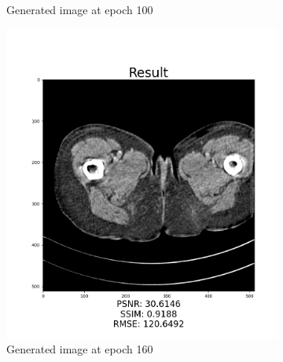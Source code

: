 \documentclass[journal]{IEEEtran}
\begin{document}
\begin{figure}
\begin{subfigure}[t]{0.22\textwidth}
         \caption{Generated image at epoch 100}
         \label{epoch100}
     \end{subfigure}
     \begin{subfigure}[t]{0.22\textwidth}
         \centering
         \includegraphics[width=\textwidth]{epoch160}
         \caption{Generated image at epoch 160}
         \label{epoch160}
     \end{subfigure}
     \begin{subfigure}[t]{0.22\textwidth}
         \centering

\end{subfigure}
\end{figure}
\end{document}
